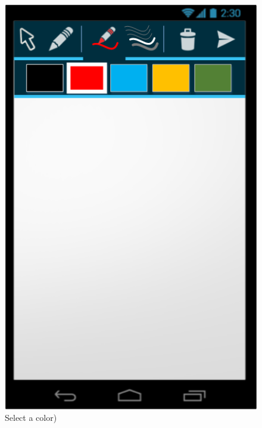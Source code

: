 \documentclass{chi-ext}
\begin{document}
\begin{figure}
  \centering
  \includegraphics[width=\linewidth]{img/android/mockup_color.png}
  \caption{Select a color)}
  \label{fig:mockup_color}
\end{figure}
\end{document}
